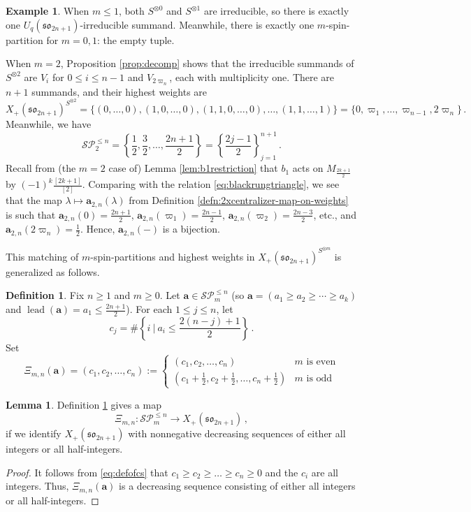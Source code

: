 \documentclass[10pt]{amsart}
\numberwithin{equation}{section}
\theoremstyle{definition}
\newtheorem{lem}[thm]{Lemma}
\newtheorem{defn}[thm]{Definition}
\newtheorem{example}[thm]{Example}
\newcommand{\son}[1][2n+1]{\mathfrak{so}_{#1}}
\newcommand{\ot}{\otimes}
\newcommand{\ab}{\mathbf{a}}
\DeclareMathOperator{\lead}{lead}
\newcommand{\SP}{\mathcal{SP}}
\begin{document}
\begin{example}\label{ex:m2discussionformatching}
When $m \le 1$, both $S^{\ot 0}$ and $S^{\ot 1}$ are irreducible, 
so there is exactly one $U_q(\son)$-irreducible summand. 
Meanwhile, there is exactly one $m$-spin-partition for $m=0, 1$: 
the empty tuple.

When $m=2$, Proposition \ref{prop:decomp} shows that the
irreducible summands of $S^{\ot 2}$ are $V_i$ for $0 \le i \le n-1$ and $V_{2 \varpi_n}$, 
each with multiplicity one.
There are $n+1$ summands, and their highest weights are
\[
X_+(\son)^{S^{\otimes 2}}=\{(0,\ldots, 0), (1,0,\ldots, 0), (1,1,0,\ldots, 0), \ldots, (1,1,\ldots, 1)\}
	= \{0,\varpi_1,\ldots,\varpi_{n-1},2\varpi_n\} \, .
\]
Meanwhile, we have
\[
\SP_2^{\le n} = \left\{\frac{1}{2}, \frac{3}{2}, \dots, \frac{2n+1}{2}\right\} 
= \left\{ \frac{2j-1}{2} \right\}_{j=1}^{n+1} \, .
\] 
Recall from (the $m=2$ case of) Lemma \ref{lem:b1restriction} that $b_1$ acts on 
$M_{\frac{2k+1}{2}}$ by $(-1)^k \frac{[2k+1]}{[2]}$.
Comparing with the relation \eqref{eq:blackrungtriangle}, 
we see that the map $\lambda\mapsto \ab_{2,n}(\lambda)$ 
from Definition \ref{defn:2xcentralizer-map-on-weights} is such that 
$\ab_{2,n}(0) = \frac{2n+1}{2}$, $\ab_{2,n}(\varpi_1) = \frac{2n-1}{2}$, $\ab_{2,n}(\varpi_2) = \frac{2n-3}{2}$, etc., 
and $\ab_{2,n}(2 \varpi_n) = \frac{1}{2}$.
Hence, $\ab_{2,n}(-)$ is a bijection.
\end{example}

This matching of $m$-spin-partitions and highest weights in $X_+(\son)^{S^{\otimes m}}$ is generalized as follows.

\begin{defn}\label{def:xi}
Fix $n \ge 1$ and $m \ge 0$. 
Let $\ab \in\SP_m^{\le n}$
(so $\ab= (a_1 \ge a_2 \ge \cdots \ge a_k)$ and $\lead(\ab) = a_1 \le \frac{2n+1}{2}$). 
For each $1 \le j \le n$, let 
\begin{equation}\label{eq:defofcs}
c_j = \# \left\{i \ \bigg| \ a_i \le \frac{2(n-j)+1}{2} \right\} \, .
\end{equation}
Set
\[
\Xi_{m,n}(\ab) = (c_1, c_2, \ldots, c_n) :=
\begin{cases}
(c_1, c_2, \ldots, c_n) & m \text{ is even} \\
(c_1 + \frac{1}{2}, c_2 + \frac{1}{2}, \ldots, c_n + \frac{1}{2}) & m \text{ is odd}
	\end{cases}
\]
\end{defn}

\begin{lem}\label{lem:xi-in-dominant}
Definition \ref{def:xi} gives a map 
\[
\Xi_{m,n} \colon \SP_m^{\le n}\rightarrow X_+(\son) \, ,
\]
if we identify $X_+(\son)$ with nonnegative decreasing sequences of either all integers or all half-integers.
\end{lem}
\begin{proof}
It follows from \eqref{eq:defofcs} that $c_1 \ge c_2 \ge \ldots \ge c_n \ge 0$ and the $c_i$ are all integers. 
Thus, $\Xi_{m,n}(\ab)$ is a decreasing sequence consisting of either all integers or all half-integers.
\end{proof}
\end{document}
